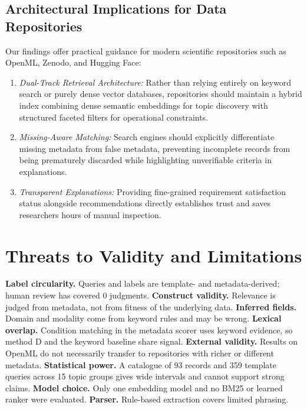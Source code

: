 \documentclass[conference]{IEEEtran}
\begin{document}
\subsection{Architectural Implications for Data Repositories}
Our findings offer practical guidance for modern scientific repositories such as OpenML, Zenodo, and Hugging Face:
\begin{enumerate}
\item \emph{Dual-Track Retrieval Architecture:} Rather than relying entirely on keyword search or purely dense vector databases, repositories should maintain a hybrid index combining dense semantic embeddings for topic discovery with structured faceted filters for operational constraints.
\item \emph{Missing-Aware Matching:} Search engines should explicitly differentiate missing metadata from false metadata, preventing incomplete records from being prematurely discarded while highlighting unverifiable criteria in explanations.
\item \emph{Transparent Explanations:} Providing fine-grained requirement satisfaction status alongside recommendations directly establishes trust and saves researchers hours of manual inspection.
\end{enumerate}

\section{Threats to Validity and Limitations}
\textbf{Label circularity.} Queries and labels are template- and metadata-derived; human review has covered 0 judgments. \textbf{Construct validity.} Relevance is judged from metadata, not from fitness of the underlying data. \textbf{Inferred fields.} Domain and modality come from keyword rules and may be wrong. \textbf{Lexical overlap.} Condition matching in the metadata scorer uses keyword evidence, so method D and the keyword baseline share signal. \textbf{External validity.} Results on OpenML do not necessarily transfer to repositories with richer or different metadata. \textbf{Statistical power.} A catalogue of 93 records and 359 template queries across 15 topic groups gives wide intervals and cannot support strong claims. \textbf{Model choice.} Only one embedding model and no BM25 or learned ranker were evaluated. \textbf{Parser.} Rule-based extraction covers limited phrasing.
\end{document}
